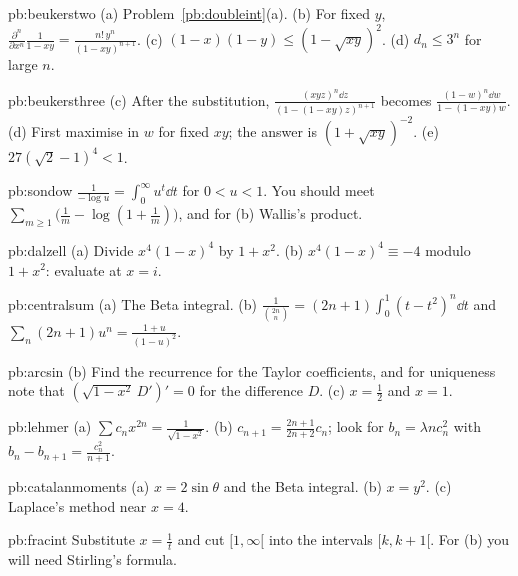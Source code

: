 \begin{hint}{pb:beukerstwo}
(a) Problem~\ref{pb:doubleint}(a). (b) For fixed $y$, $\frac{\partial^n}{\partial x^n}\frac1{1-xy}=\frac{n!\,y^n}{(1-xy)^{n+1}}$. (c) $(1-x)(1-y)\le(1-\sqrt{xy})^2$.
(d) $d_n\le3^n$ for large $n$.
\end{hint}

\begin{hint}{pb:beukersthree}
(c) After the substitution, $\frac{(xyz)^n\dd z}{(1-(1-xy)z)^{n+1}}$ becomes $\frac{(1-w)^n\dd w}{1-(1-xy)w}$. (d) First maximise in $w$ for fixed $xy$; the
answer is $(1+\sqrt{xy})^{-2}$. (e) $27(\sqrt2-1)^4<1$.
\end{hint}

\begin{hint}{pb:sondow}
$\frac1{-\log u}=\int_0^\infty u^t\dd t$ for $0<u<1$. You should meet $\sum_{m\ge1}\bigl(\frac1m-\log(1+\frac1m)\bigr)$, and for (b) Wallis's product.
\end{hint}

\begin{hint}{pb:dalzell}
(a) Divide $x^4(1-x)^4$ by $1+x^2$. (b) $x^4(1-x)^4\equiv-4$ modulo $1+x^2$: evaluate at $x=i$.
\end{hint}

\begin{hint}{pb:centralsum}
(a) The Beta integral. (b) $\frac1{\binom{2n}n}=(2n+1)\int_0^1(t-t^2)^n\dd t$ and $\sum_n(2n+1)u^n=\frac{1+u}{(1-u)^2}$.
\end{hint}

\begin{hint}{pb:arcsin}
(b) Find the recurrence for the Taylor coefficients, and for uniqueness note that $(\sqrt{1-x^2}\,D')'=0$ for the difference $D$.
(c) $x=\frac12$ and $x=1$.
\end{hint}

\begin{hint}{pb:lehmer}
(a) $\sum c_nx^{2n}=\frac1{\sqrt{1-x^2}}$. (b) $c_{n+1}=\frac{2n+1}{2n+2}c_n$; look for $b_n=\lambda nc_n^2$ with $b_n-b_{n+1}=\frac{c_n^2}{n+1}$.
\end{hint}

\begin{hint}{pb:catalanmoments}
(a) $x=2\sin\theta$ and the Beta integral. (b) $x=y^2$. (c) Laplace's method near $x=4$.
\end{hint}

\begin{hint}{pb:fracint}
Substitute $x=\frac1t$ and cut $[1,\infty[$ into the intervals $[k,k+1[$. For (b) you will need Stirling's formula.
\end{hint}

